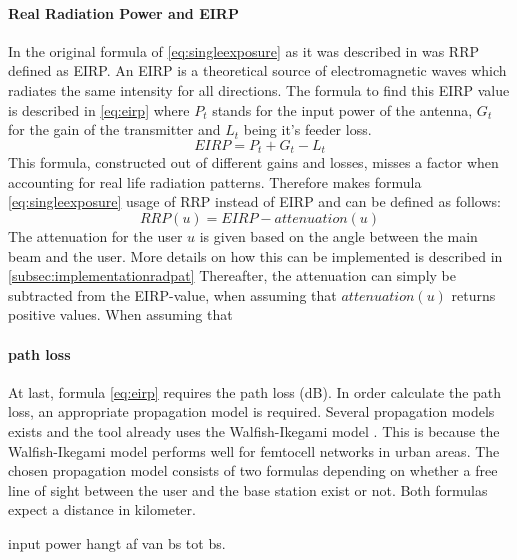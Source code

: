 \paragraph{Real Radiation Power and EIRP}
In the original formula of \ref{eq:singleexposure} as it was described in \cite{J1, J6_originalExposureFormula} 
was \gls{RRP} defined as \gls{EIRP}. An \gls{EIRP} is a theoretical source of electromagnetic waves which radiates the same intensity for all directions. 
The formula to find this \gls{EIRP} value is described in \ref{eq:eirp}
where $P_t$ stands for the input power of the antenna, $G_t$ for the gain of the transmitter and $L_t$ being it's feeder loss.
\begin{equation}
EIRP = P_t + G_t - L_t
\label{eq:eirp}
\end{equation}
This formula, constructed out of different gains and losses, misses a factor when accounting for real life radiation patterns.
Therefore makes formula \ref{eq:singleexposure} usage of \gls{RRP} instead of \gls{EIRP} and can be defined as follows:
\begin{equation}
RRP(u) = EIRP - attenuation(u)
\label{eq:rrp}
\end{equation}
The attenuation for the user $u$ is given based on the angle between the main beam and the user. More details on how this can be implemented is described in \ref{subsec:implementationradpat}
Thereafter, the attenuation can simply be subtracted from the EIRP-value, when assuming that $attenuation(u)$ returns positive values.
When assuming that 
\paragraph{path loss}
\label{subsec:pl}
At last, formula \ref{eq:eirp} requires the path loss (dB). In order calculate the path loss, an appropriate propagation model is required. Several propagation models exists and the tool already uses the Walfish-Ikegami model \cite{J2}.
This is because the Walfish-Ikegami model performs well for femtocell networks in urban areas. %
The chosen propagation model consists of two formulas depending on whether a free line of sight between the user and the base station exist or not. Both formulas expect a distance in kilometer. %

input power hangt af van bs tot bs.

